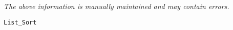 \label{pkg:list\_mergesort}

{\tiny \it The above information is manually maintained and may contain errors.}
\begin{verbatim}
List_Sort
\end{verbatim}
